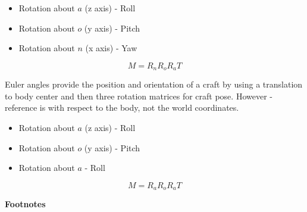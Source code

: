 \begin{itemize}
\tightlist
\item
  Rotation about \(a\) (z axis) - Roll
\item
  Rotation about \(o\) (y axis) - Pitch
\item
  Rotation about \(n\) (x axis) - Yaw
\end{itemize}

\[M = R_nR_oR_aT\]

Euler angles provide the position and orientation of a craft by using a
translation to body center and then three rotation matrices for craft
pose. However - reference is with respect to the body, not the world
coordinates.

\begin{itemize}
\tightlist
\item
  Rotation about \(a\) (z axis) - Roll
\item
  Rotation about \(o\) (y axis) - Pitch
\item
  Rotation about \(a\) - Roll
\end{itemize}

\[M = R_aR_oR_aT\]

\textbf{Footnotes}
